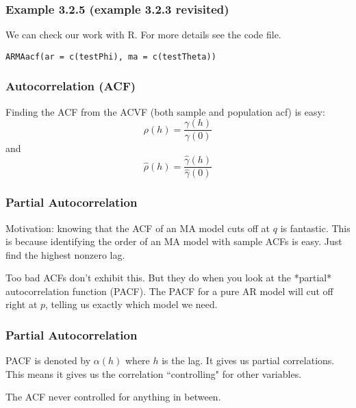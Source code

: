 \documentclass{beamer}
\begin{document}

\begin{frame}[fragile]
\frametitle{Example 3.2.5 (example 3.2.3 revisited)}

We can check our work with R. For more details see the code file.

\begin{verbatim}
ARMAacf(ar = c(testPhi), ma = c(testTheta))
\end{verbatim}

\end{frame}




\begin{frame}
\frametitle{Autocorrelation (ACF)}

Finding the ACF from the ACVF (both sample and population acf) is easy:
\[
\rho(h) = \frac{\gamma(h)}{\gamma(0)}
\]
and
\[
\hat{\rho}(h) = \frac{\hat{\gamma}(h)}{\hat{\gamma}(0)}
\]

\end{frame}


\begin{frame}
\frametitle{Partial Autocorrelation}

Motivation: knowing that the ACF of an MA model cuts off at $q$ is fantastic. This is because identifying the order of an MA model with sample ACFs is easy. Just find the highest nonzero lag.  
\newline

Too bad ACFs don't exhibit this. But they do when you look at the *partial* autocorrelation function (PACF). The PACF for a pure AR model will cut off right at $p$, telling us exactly which model we need. 

\end{frame}


\begin{frame}
\frametitle{Partial Autocorrelation}

PACF is denoted by $\alpha(h)$ where $h$ is the lag. It gives us partial correlations. This means it gives us the correlation ``controlling" for other variables. 
\newline

The ACF never controlled for anything in between.
% 
% 




\end{frame}
\end{document}
